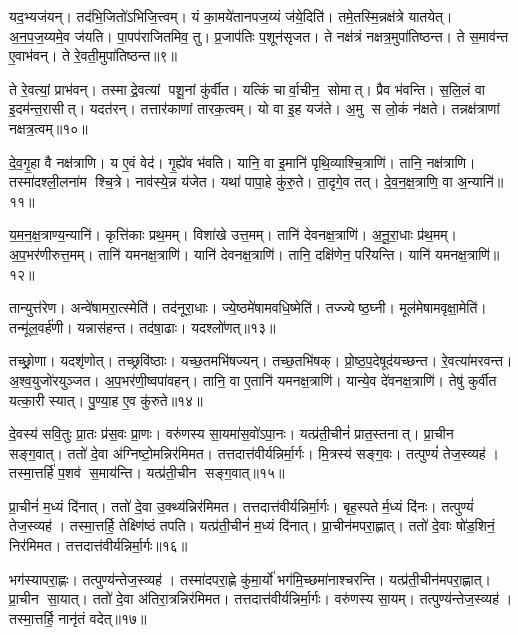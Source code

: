 यद॒भ्यज॑यन्। तद॑भि॒जितो॑ऽभिजि॒त्त्वम्। यं का॒मये॑तानपज॒य्यं ज॑ये॒दिति॑। तमे॒तस्मि॒न्नक्ष॑त्रे यातयेत्। अ॒न॒प॒ज॒य्यमे॒व ज॑यति। पा॒पप॑राजितमिव॒ तु। प्र॒जाप॑तिः प॒शून॑सृजत। ते नक्ष॑त्रं नक्षत्र॒मुपा॑तिष्ठन्त। ते स॒माव॑न्त ए॒वाभ॑वन्। ते रे॒वती॒मुपा॑तिष्ठन्त॥९॥

ते रे॒वत्यां॒ प्राभ॑वन्। तस्माद्रे॒वत्यां पशू॒नां कु॑र्वीत। यत्किं चार्वा॒चीन॒ सोमात्। प्रैव भ॑वन्ति। स॒लि॒लं वा इ॒दम॑न्त॒रासीत्। यदत॑रन्। तत्तार॑काणां तारक॒त्वम्। यो वा इ॒ह यज॑ते। अ॒मु स लो॒कं न॑क्षते। तन्नक्ष॑त्राणां नक्षत्र॒त्वम्॥१०॥

दे॒व॒गृ॒हा वै नक्ष॑त्राणि। य ए॒वं वेद॑। गृ॒ह्ये॑व भ॑वति। यानि॒ वा इ॒मानि॑ पृथि॒व्याश्चि॒त्राणि॑। तानि॒ नक्ष॑त्राणि। तस्मा॑दश्ली॒लना॑म श्चि॒त्रे। नाव॑स्ये॒न्न य॑जेत। यथा॑ पापा॒हे कु॑रु॒ते। ता॒दृगे॒व तत्। दे॒व॒न॒क्ष॒त्राणि॒ वा अ॒न्यानि॑॥११॥

य॒म॒न॒क्ष॒त्राण्य॒न्यानि॑। कृत्ति॑काः प्रथ॒मम्। विशा॑खे उत्त॒मम्। तानि॑ देवनक्ष॒त्राणि॑। अ॒नू॒रा॒धाः प्र॑थ॒मम्। अ॒प॒भर॑णीरुत्त॒मम्। तानि॑ यमनक्ष॒त्राणि॑। यानि॑ देवनक्ष॒त्राणि॑। तानि॒ दक्षि॑णेन॒ परि॑यन्ति। यानि॑ यमनक्ष॒त्राणि॑॥१२॥

तान्युत्त॑रेण। अन्वे॑षामरा॒त्स्मेति॑। तद॑नूरा॒धाः। ज्ये॒ष्ठमे॑षाम\-वधि॒ष्मेति॑। तज्ज्येष्ठ॒घ्नी। मूल॑मेषामवृक्षा॒मेति॑। तन्मू॑ल॒वर्\mbox{}ह॑णी। यन्नास॑हन्त। तद॑षा॒ढाः। यदश्लो॑णत्॥१३॥

तच्छ्रो॒णा। यदशृ॑णोत्। तच्छ्रवि॑ष्ठाः। यच्छ॒तमभि॑षज्यन्। तच्छ॒तभि॑षक्। प्रो॒ष्ठ॒प॒देषूद॑यच्छन्त। रे॒वत्या॑मरवन्त। अ॒श्व॒युजो॑रयुञ्जत। अ॒प॒भर॑णी॒ष्वपा॑वहन्। तानि॒ वा ए॒तानि॑ यमनक्ष॒त्राणि॑। यान्ये॒व दे॑वनक्ष॒त्राणि॑। तेषु॑ कुर्वीत यत्का॒री स्यात्। पु॒ण्या॒ह ए॒व कु॑रुते॥१४॥

दे॒वस्य॑ सवि॒तुः प्रा॒तः प्र॑स॒वः प्रा॒णः। वरु॑णस्य सा॒यमा॑स॒वो॑ऽपा॒नः। यत्प्र॑ती॒चीनं॑ प्रात॒स्तनात्। प्रा॒चीन सङ्ग॒वात्। ततो॑ दे॒वा अ॑ग्निष्टो॒मन्निर॑मिमत। तत्तदात्त॑वीर्य\-न्निर्मा॒र्गः। मि॒त्रस्य॑ सङ्ग॒वः। तत्पुण्यं॑ तेज॒स्व्यह॑। तस्मा॒त्तर्\mbox{}हि॑ प॒शव॑ स॒माय॑न्ति। यत्प्र॑ती॒चीन सङ्ग॒वात्॥१५॥

प्रा॒चीनं॑ म॒ध्यं दि॑नात्। ततो॑ दे॒वा उ॒क्थ्य॑न्निर॑मिमत। तत्तदात्त॑वीर्यन्निर्मा॒र्गः। बृह॒स्पतेर्म॒ध्यं दि॑नः। तत्पुण्यं॑ तेज॒स्व्यह॑। तस्मा॒त्तर्\mbox{}हि॒ तेक्ष्णि॑ष्ठं तपति। यत्प्र॑ती॒चीनं॑ म॒ध्यं दि॑नात्। प्रा॒चीन॑मपरा॒ह्णात्। ततो॑ दे॒वाः षो॑ड॒शिनं॒ निर॑मिमत। तत्तदात्त॑वीर्यन्निर्मा॒र्गः॥१६॥

भग॑स्यापरा॒ह्णः। तत्पुण्य॑न्तेज॒स्व्यह॑। तस्मा॑दपरा॒ह्णे कु॑मा॒र्यो॑ भग॑मि॒च्छमा॑नाश्चरन्ति। यत्प्र॑ती॒चीन॑मपरा॒ह्णात्। प्रा॒चीन सा॒यात्। ततो॑ दे॒वा अ॑तिरा॒त्रन्निर॑मिमत। तत्तदात्त॑वीर्यन्निर्मा॒र्गः। वरु॑णस्य सा॒यम्। तत्पुण्य॑न्तेज॒स्व्यह॑। तस्मा॒त्तर्\mbox{}हि॒ नानृ॑तं वदेत्॥१७॥

